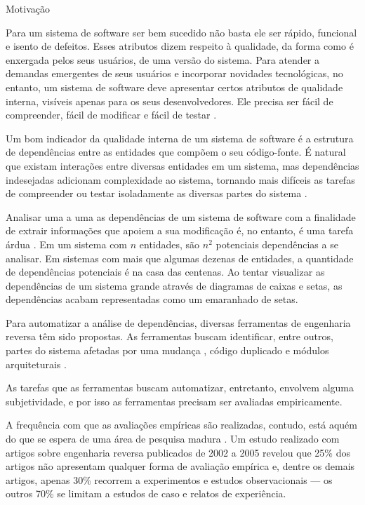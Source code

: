 \begin{section}{Motivação}

		Para um sistema de software ser bem sucedido não basta ele ser rápido, funcional e isento de defeitos. Esses atributos dizem respeito à qualidade, da forma como é enxergada pelos seus usuários, de uma versão do sistema. Para atender a demandas emergentes de seus usuários e incorporar novidades tecnológicas, no entanto, um sistema de software deve apresentar certos atributos de qualidade interna, visíveis apenas para os seus desenvolvedores. Ele precisa ser fácil de compreender, fácil de modificar e fácil de testar \cite{Parnas1994}.

		Um bom indicador da qualidade interna de um sistema de software é a estrutura de dependências entre as entidades que compõem o seu código-fonte. É natural que existam interações entre diversas entidades em um sistema, mas dependências indesejadas adicionam complexidade ao sistema, tornando mais difíceis as tarefas de compreender ou testar isoladamente as diversas partes do sistema \cite{Chidamber1994}. %

		Analisar uma a uma as dependências de um sistema de software com a finalidade de extrair informações que apoiem a sua modificação é, no entanto, é uma tarefa árdua \cite{Tonella2007}. Em um sistema com $n$ entidades, são $n^2$ potenciais dependências a se analisar. Em sistemas com mais que algumas dezenas de entidades, a quantidade de dependências potenciais é na casa das centenas. Ao tentar visualizar as dependências de um sistema grande através de diagramas de caixas e setas, as dependências acabam representadas como um emaranhado de setas.
		
		
		Para automatizar a análise de dependências, diversas ferramentas de engenharia reversa têm sido propostas. As ferramentas buscam identificar, entre outros, partes do sistema afetadas por uma mudança \cite{Arnold1993}, código duplicado \cite{Roy2007} e módulos arquiteturais \cite{Maqbool2007}.

	As tarefas que as ferramentas buscam automatizar, entretanto, envolvem alguma subjetividade, e por isso as ferramentas precisam ser avaliadas empiricamente. %
	
	 A frequência com que as avaliações empíricas são realizadas, contudo, está aquém do que se espera de uma área de pesquisa madura \cite{Tonella2007}. Um estudo realizado com artigos sobre engenharia reversa publicados de 2002 a 2005 revelou que 25\% dos artigos não apresentam qualquer forma de avaliação empírica e, dentre os demais artigos, apenas 30\% recorrem a experimentos e estudos observacionais --- os outros 70\% se limitam a estudos de caso e relatos de experiência.


\end{section}
